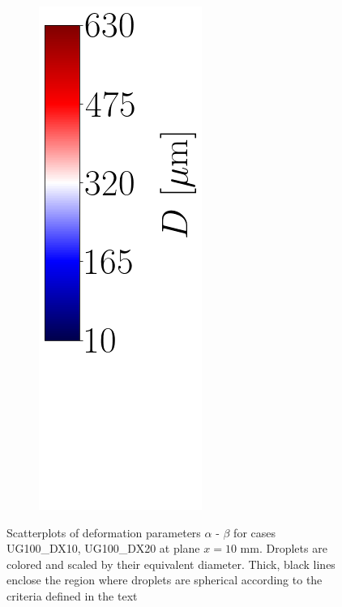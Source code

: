 \begin{figure}[ht]
\begin{subfigure}[b]{0.4\textwidth}
\end{subfigure}
\begin{subfigure}[b]{0.1\textwidth}
	\centering
	\hspace*{0.35in}
   \includegraphics[scale=0.4]{./part2_developments/figures_ch5_resolved_JICF/SPRAY_characterization/deformation/scatterplots_colorbar_D_with_blank_space.png}
\end{subfigure}
   \caption[Scatterplots of deformation parameters $\alpha$ - $\beta$ for cases UG100\_DX10, UG100\_DX20 at plane $x = 10$ mm]{Scatterplots of deformation parameters $\alpha$ - $\beta$ for cases UG100\_DX10, UG100\_DX20 at plane $x = 10$ mm. Droplets are colored and scaled by their equivalent diameter. Thick, black lines enclose the region where droplets are spherical according to the criteria defined in the text}
\label{fig:jicf_global_scatterplots_deformation}
\end{figure}




\clearpage

